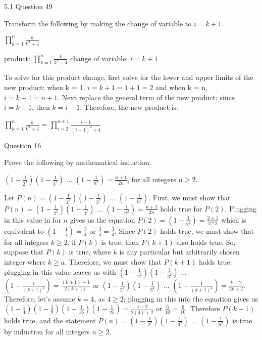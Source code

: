 \documentclass{article}
\author{Joshua Harthan}
\begin{document}
5.1 Question 49
\item[]Transform the following by making the change of variable to $i = k + 1$.
\item[]$\prod_{k=1} ^{n} \frac{k}{k^{2} + 4}$ 
\item[]product: $\prod_{k=1} ^{n} \frac{k}{k^{2} + 4}$ \;\;\;\;\; change of variable: $i = k + 1$
\item[]To solve for this product change, first solve for the lower and upper limits of the new product: when k = 1, $i = k + 1 = 1 + 1 = 2$ and when k = n, $i = k + 1 = n + 1$. Next replace the general term of the new product: since $i = k + 1$, then $k = i - 1$. Therefore, the new product is:
\item[]$\prod_{k=1} ^{n} \frac{k}{k^{2} + 4}$ = $\prod_{i = 2} ^{n + 1} \frac{i - 1}{(i -1)^{2} + 4}$ 

\clearpage
{} Question 16
\item[]Prove the following by mathematical induction.
\item[]$(1 - \frac{1}{2^{2}})(1 -\frac{1}{3^{2}})$ ... $(1 -\frac{1}{n^{2}}) = \frac{n + 1}{2n}$, for all integers $n \geq 2$.
\item[] Let $P(n) = (1 - \frac{1}{2^{2}})(1 -\frac{1}{3^{2}})$ ... $(1 -\frac{1}{n^{2}})$. First, we must show that $P(n) = (1 - \frac{1}{2^{2}})(1 -\frac{1}{3^{2}})$ ... $(1 -\frac{1}{n^{2}}) = \frac{n + 1}{2n}$ holds true for $P(2)$. Plugging in this value in for $n$ gives us the equation $P(2) = (1 - \frac{1}{2^{2}}) = \frac{2 + 1}{2*2}$ which is equivalent to $(1- \frac{1}{4}) = \frac{3}{4}$ or $\frac{3}{4} = \frac{3}{4}$. Since $P(2)$ holds true, we must show that for all integers $k \geq 2$, if $P(k)$ is true, then $P(k+1)$ also holds true. So, suppose that $P(k)$ is true, where $k$ is any particular but arbitrarily chosen integer where $k \geq a$. Therefore, we must show that $P(k+1)$ holds true; plugging in this value leaves us with 
$(1 - \frac{1}{2^{2}})(1 -\frac{1}{3^{2}})$ ... $(1 -\frac{1}{(k+1)^{2}}) = \frac{(k+1) + 1}{2(k+1)}$ or $(1 - \frac{1}{2^{2}})(1 -\frac{1}{3^{2}})$ ... $(1 -\frac{1}{(k+1)^{2}}) = \frac{k + 2}{2k + 2}$. Therefore, let's assume $k = 4$, as $4 \geq 2$; plugging in this into the equation gives us $(1 - \frac{1}{4})(1 -\frac{1}{9})(1 -\frac{1}{16})(1 -\frac{1}{25}) = \frac{4 + 2}{2(4) + 2}$ or $\frac{6}{10} = \frac{6}{10}$. Therefore $P(k+1)$ holds true, and the statement $P(n) = (1 - \frac{1}{2^{2}})(1 -\frac{1}{3^{2}})$ ... $(1 -\frac{1}{n^{2}})$ is true by induction for all integers $n \geq 2$.
\end{document}
